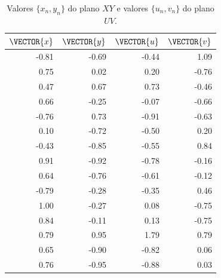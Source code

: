 \noindent
\begin{minipage}{0.4\textwidth}
\centering
\begin{minipage}{0.9\textwidth}
\begin{table}[H]%
\centering
\begin{tabular}{ |r |r || r |r|}
\hline
   $\VECTOR{x}$ & $\VECTOR{y}$ & $\VECTOR{u}$ & $\VECTOR{v}$ \\ \hline \hline
  -0.81 &-0.69 &-0.44 & 1.09 \\ 
   0.75 & 0.02 & 0.20 &-0.76 \\ 
   0.47 & 0.67 & 0.73 &-0.46 \\ 
   0.66 &-0.25 &-0.07 &-0.66 \\ 
  -0.76 & 0.73 &-0.91 &-0.63 \\ 
   0.10 &-0.72 &-0.50 & 0.20 \\ 
  -0.43 &-0.85 &-0.55 & 0.84 \\ 
   0.91 &-0.92 &-0.78 &-0.16 \\ 
   0.64 &-0.76 &-0.61 &-0.12 \\ 
  -0.79 &-0.28 &-0.35 & 0.46 \\ 
   1.00 &-0.27 & 0.08 &-0.75 \\ 
   0.84 &-0.11 & 0.13 &-0.75 \\ 
   0.79 & 0.95 & 1.79 & 0.79 \\ 
   0.65 &-0.90 &-0.82 & 0.06 \\ 
   0.76 &-0.95 &-0.88 & 0.03 \\ \hline
\end{tabular}
\caption{Valores $\{x_n,y_n\}$ do plano $XY$ e valores $\{u_n,v_n\}$ do plano $UV$.}
\label{table:ex:mapeamentor2r2}
\end{table}
\end{minipage}
\end{minipage}
